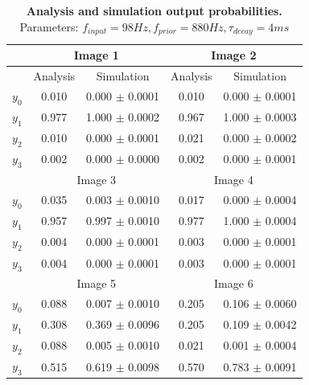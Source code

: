 \begin{table}[]
\label{tab:doubleSize_98_880_4}
\small
\tabcolsep=0.11cm
\begin{tabular}{|c|cc|cc|}
\hline
                       & \multicolumn{2}{c|}{Image 1}                       & \multicolumn{2}{c|}{Image 2}                       \\ \hline
                       & \multicolumn{1}{c|}{Analysis} & Simulation         & \multicolumn{1}{c|}{Analysis} & Simulation         \\ \hline
$y_0$                  & \multicolumn{1}{c|}{0.010}    & 0.000 $\pm$ 0.0001 & \multicolumn{1}{c|}{0.010}    & 0.000 $\pm$ 0.0001 \\ \hline
$y_1$                  & \multicolumn{1}{c|}{0.977}    & 1.000 $\pm$ 0.0002 & \multicolumn{1}{c|}{0.967}    & 1.000 $\pm$ 0.0003 \\ \hline
$y_2$                  & \multicolumn{1}{c|}{0.010}    & 0.000 $\pm$ 0.0001 & \multicolumn{1}{c|}{0.021}    & 0.000 $\pm$ 0.0002 \\ \hline
$y_3$                  & \multicolumn{1}{c|}{0.002}    & 0.000 $\pm$ 0.0000 & \multicolumn{1}{c|}{0.002}    & 0.000 $\pm$ 0.0001 \\ \hline
                       & \multicolumn{2}{c|}{Image 3}                       & \multicolumn{2}{c|}{Image 4}                       \\ \hline
$y_0$                  & \multicolumn{1}{c|}{0.035}    & 0.003 $\pm$ 0.0010 & \multicolumn{1}{c|}{0.017}    & 0.000 $\pm$ 0.0004 \\ \hline
$y_1$                  & \multicolumn{1}{c|}{0.957}    & 0.997 $\pm$ 0.0010 & \multicolumn{1}{c|}{0.977}    & 1.000 $\pm$ 0.0004 \\ \hline
$y_2$                  & \multicolumn{1}{c|}{0.004}    & 0.000 $\pm$ 0.0001 & \multicolumn{1}{c|}{0.003}    & 0.000 $\pm$ 0.0001 \\ \hline
$y_3$                  & \multicolumn{1}{c|}{0.004}    & 0.000 $\pm$ 0.0001 & \multicolumn{1}{c|}{0.003}    & 0.000 $\pm$ 0.0001 \\ \hline
						& \multicolumn{2}{c|}{Image 5}                       & \multicolumn{2}{c|}{Image 6}                       \\ \hline
$y_0$                  & \multicolumn{1}{c|}{0.088}    & 0.007 $\pm$ 0.0010 & \multicolumn{1}{c|}{0.205}    & 0.106 $\pm$ 0.0060 \\ \hline
$y_1$                  & \multicolumn{1}{c|}{0.308}    & 0.369 $\pm$ 0.0096 & \multicolumn{1}{c|}{0.205}    & 0.109 $\pm$ 0.0042 \\ \hline
$y_2$                  & \multicolumn{1}{c|}{0.088}    & 0.005 $\pm$ 0.0010 & \multicolumn{1}{c|}{0.021}    & 0.001 $\pm$ 0.0004 \\ \hline
$y_3$                  & \multicolumn{1}{c|}{0.515}    & 0.619 $\pm$ 0.0098 & \multicolumn{1}{c|}{0.570}    & 0.783 $\pm$ 0.0091 \\ \hline
\end{tabular}
\caption{\textbf{Analysis and simulation output probabilities. } Parameters: $f_{input} = 98 Hz, f_{prior} = 880 Hz, \tau_{decay} = 4 ms$}
\end{table}

